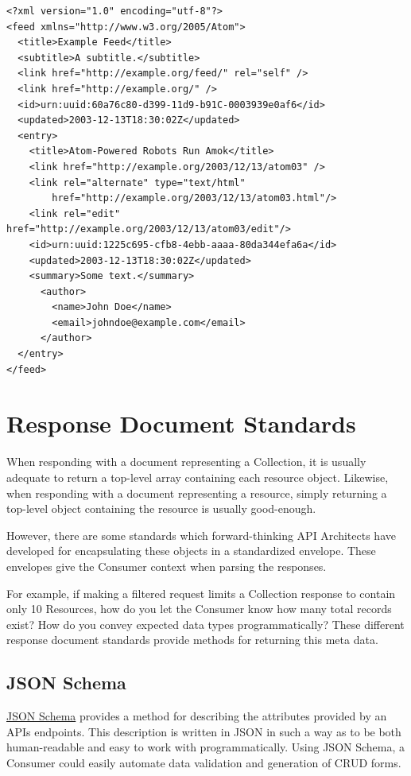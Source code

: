\documentclass{book}
\begin{document}
\begin{verbatim}
<?xml version="1.0" encoding="utf-8"?>
<feed xmlns="http://www.w3.org/2005/Atom">
  <title>Example Feed</title>
  <subtitle>A subtitle.</subtitle>
  <link href="http://example.org/feed/" rel="self" />
  <link href="http://example.org/" />
  <id>urn:uuid:60a76c80-d399-11d9-b91C-0003939e0af6</id>
  <updated>2003-12-13T18:30:02Z</updated>
  <entry>
    <title>Atom-Powered Robots Run Amok</title>
    <link href="http://example.org/2003/12/13/atom03" />
    <link rel="alternate" type="text/html"
        href="http://example.org/2003/12/13/atom03.html"/>
    <link rel="edit" href="http://example.org/2003/12/13/atom03/edit"/>
    <id>urn:uuid:1225c695-cfb8-4ebb-aaaa-80da344efa6a</id>
    <updated>2003-12-13T18:30:02Z</updated>
    <summary>Some text.</summary>
      <author>
        <name>John Doe</name>
        <email>johndoe@example.com</email>
      </author>
  </entry>
</feed>
\end{verbatim}


\section{Response Document Standards}

When responding with a document representing a Collection, it is usually adequate to return a top-level array containing each resource object. Likewise, when responding with a document representing a resource, simply returning a top-level object containing the resource is usually good-enough.

However, there are some standards which forward-thinking API Architects have developed for encapsulating these objects in a standardized envelope. These envelopes give the Consumer context when parsing the responses.

For example, if making a filtered request limits a Collection response to contain only 10 Resources, how do you let the Consumer know how many total records exist? How do you convey expected data types programmatically? These different response document standards provide methods for returning this meta data.

\subsection{JSON Schema}

\href{http://json-schema.org/}{JSON Schema} \cite{JSONSCHEMA} provides a method for describing the attributes provided by an APIs endpoints. This description is written in JSON in such a way as to be both human-readable and easy to work with programmatically. Using JSON Schema, a Consumer could easily automate data validation and generation of CRUD forms.
\end{document}

